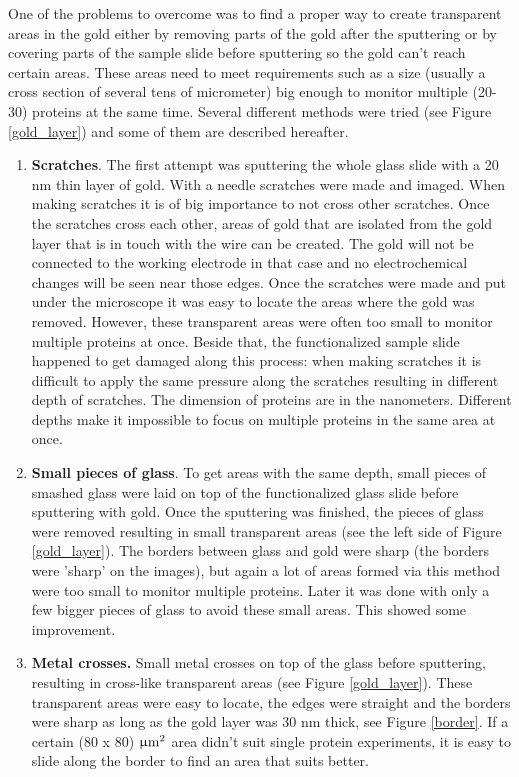 \documentclass[twoside,single]{lion-msc}
\begin{document}
One of the problems to overcome was to find a proper way to create transparent areas in the gold either by removing parts of the gold after the sputtering or by covering parts of the sample slide before sputtering so the gold can't reach certain areas. These areas need to meet requirements such as a size (usually a cross section of several tens of micrometer) big enough to monitor multiple (20-30) proteins at the same time.
Several different methods were tried (see Figure \ref{gold_layer}) and some of them are described hereafter.
\begin{enumerate}
\item \textbf{Scratches}.  The first attempt was sputtering the whole glass slide with a 20 nm thin layer of gold. With a needle scratches were made and imaged. When making scratches it is of big importance to not cross other scratches. Once the scratches cross each other, areas of gold that are isolated from the gold layer that is in touch with the wire can be created. The gold will not be connected to the working electrode in that case and no electrochemical changes will be seen near those edges. Once the scratches were made and put under the microscope it was easy to locate the areas where the gold was removed. However, these transparent areas were often too small to monitor multiple proteins at once. Beside that, the functionalized sample slide happened to get damaged along this process: when making scratches it is difficult to apply the same pressure along the scratches resulting in different depth of scratches. The dimension of proteins are in the nanometers. Different depths make it impossible to focus on multiple proteins in the same area at once.
\item \textbf{Small pieces of glass}. To get areas with the same depth, small pieces of smashed glass were laid on top of the functionalized glass slide before sputtering with gold. Once the sputtering was finished, the pieces of glass were removed resulting in small transparent areas (see the left side of Figure \ref{gold_layer}). The borders between glass and gold were sharp (the borders were 'sharp' on the images), but again a lot of areas formed via this method were too small to monitor multiple proteins. Later it was done with only a few bigger pieces of glass to avoid these small areas. This showed some improvement. 
\item \textbf{Metal crosses.} Small metal crosses on top of the glass before sputtering, resulting in cross-like transparent areas (see Figure \ref{gold_layer}). These transparent areas were easy to locate, the edges were straight and the borders were sharp as long as the gold layer was 30 nm thick, see Figure \ref{border}. If a certain (80 x 80) $\upmu \textup{m}^{2}$ area didn't suit single protein experiments, it is easy to slide along the border to find an area that suits better. 
\end{enumerate}
\end{document}
